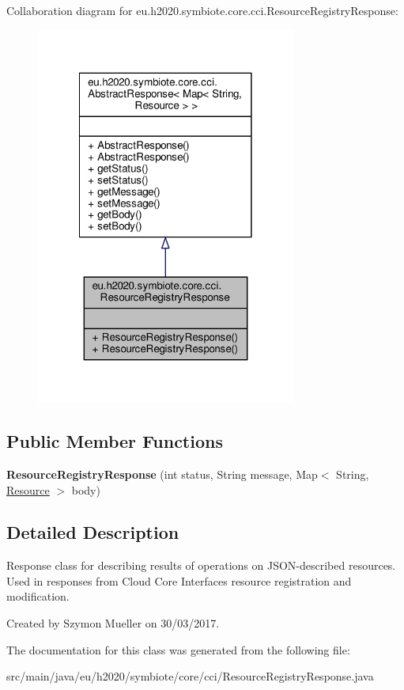 Collaboration diagram for eu.\+h2020.\+symbiote.\+core.\+cci.\+Resource\+Registry\+Response\+:
\nopagebreak
\begin{figure}[H]
\begin{center}
\leavevmode
\includegraphics[width=242pt]{classeu_1_1h2020_1_1symbiote_1_1core_1_1cci_1_1ResourceRegistryResponse__coll__graph}
\end{center}
\end{figure}
\subsection*{Public Member Functions}
\begin{DoxyCompactItemize}
\item 
\mbox{\label{classeu_1_1h2020_1_1symbiote_1_1core_1_1cci_1_1ResourceRegistryResponse_ad1ee4fc9d2dd553ac5badd860adb2999}} 
{\bfseries Resource\+Registry\+Response} (int status, String message, Map$<$ String, \hyperlink{classeu_1_1h2020_1_1symbiote_1_1model_1_1cim_1_1Resource}{Resource} $>$ body)
\end{DoxyCompactItemize}


\subsection{Detailed Description}
Response class for describing results of operations on J\+S\+O\+N-\/described resources. Used in responses from Cloud Core Interface\textquotesingle{}s resource registration and modification. 

Created by Szymon Mueller on 30/03/2017. 

The documentation for this class was generated from the following file\+:\begin{DoxyCompactItemize}
\item 
src/main/java/eu/h2020/symbiote/core/cci/Resource\+Registry\+Response.\+java\end{DoxyCompactItemize}
